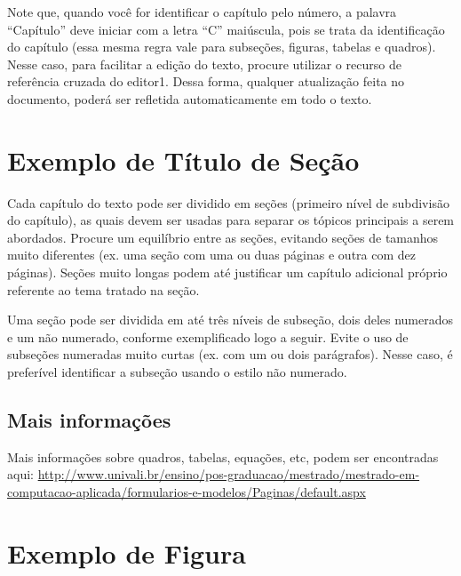 Note que, quando você for identificar o capítulo pelo número, a palavra “Capítulo” deve iniciar com a letra “C” maiúscula, pois se trata da identificação do capítulo (essa mesma regra vale para subseções, figuras, tabelas e quadros). Nesse caso, para facilitar a edição do texto, procure utilizar o recurso de referência cruzada do editor1. Dessa forma, qualquer atualização feita no documento, poderá ser refletida automaticamente em todo o texto.



\section{Exemplo de Título de Seção}
\label{s_c2_exemplo01}

Cada capítulo do texto pode ser dividido em seções (primeiro nível de subdivisão do capítulo), as quais devem ser usadas para separar os tópicos principais a serem abordados. Procure um equilíbrio entre as seções, evitando seções de tamanhos muito diferentes (ex. uma seção com uma ou duas páginas e outra com dez páginas). Seções muito longas podem até justificar um capítulo adicional próprio referente ao tema tratado na seção.

Uma seção pode ser dividida em até três níveis de subseção, dois deles numerados e um não numerado, conforme exemplificado logo a seguir. Evite o uso de subseções numeradas muito curtas (ex. com um ou dois parágrafos). Nesse caso, é preferível identificar a subseção usando o estilo não numerado.




\subsection{Mais informações}
\label{ss_c2_mais-info}

Mais informações sobre quadros, tabelas, equações, etc, podem ser encontradas aqui: \url{http://www.univali.br/ensino/pos-graduacao/mestrado/mestrado-em-computacao-aplicada/formularios-e-modelos/Paginas/default.aspx}





\section{Exemplo de Figura}
\label{ss_c2_exemplo-figura}


